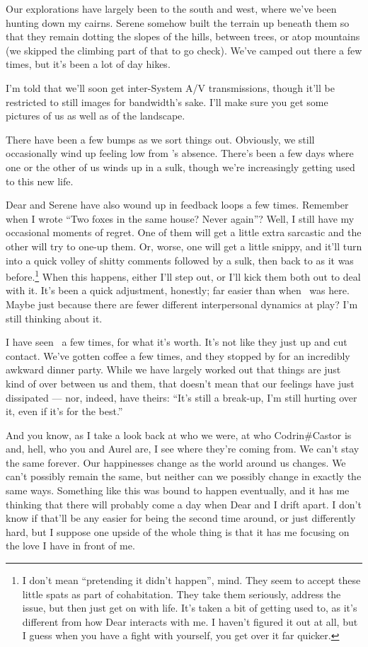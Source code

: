 Our explorations have largely been to the south and west, where we've been hunting down my cairns. Serene somehow built the terrain up beneath them so that they remain dotting the slopes of the hills, between trees, or atop mountains (we skipped the climbing part of that to go check). We've camped out there a few times, but it's been a lot of day hikes.

I'm told that we'll soon get inter-System A/V transmissions, though it'll be restricted to still images for bandwidth's sake. I'll make sure you get some pictures of us as well as of the landscape.

There have been a few bumps as we sort things out. Obviously, we still occasionally wind up feeling low from \Partner 's absence. There's been a few days where one or the other of us winds up in a sulk, though we're increasingly getting used to this new life.

Dear and Serene have also wound up in feedback loops a few times. Remember when I wrote ``Two foxes in the same house? Never again''? Well, I still have my occasional moments of regret. One of them will get a little extra sarcastic and the other will try to one-up them. Or, worse, one will get a little snippy, and it'll turn into a quick volley of shitty comments followed by a sulk, then back to as it was before.\footnote{I don't mean ``pretending it didn't happen'', mind. They seem to accept these little spats as part of cohabitation. They take them seriously, address the issue, but then just get on with life. It's taken a bit of getting used to, as it's different from how Dear interacts with me. I haven't figured it out at all, but I guess when you have a fight with yourself, you get over it far quicker.} When this happens, either I'll step out, or I'll kick them both out to deal with it. It's been a quick adjustment, honestly; far easier than when \Partner\ was here. Maybe just because there are fewer different interpersonal dynamics at play? I'm still thinking about it.

I have seen \Partner\ a few times, for what it's worth. It's not like they just up and cut contact. We've gotten coffee a few times, and they stopped by for an incredibly awkward dinner party. While we have largely worked out that things are just kind of over between us and them, that doesn't mean that our feelings have just dissipated — nor, indeed, have theirs: ``It's still a break-up, I'm still hurting over it, even if it's for the best.''

And you know, as I take a look back at who we were, at who Codrin\#Castor is and, hell, who you and Aurel are, I see where they're coming from. We can't stay the same forever. Our happinesses change as the world around us changes. We can't possibly remain the same, but neither can we possibly change in exactly the same ways. Something like this was bound to happen eventually, and it has me thinking that there will probably come a day when Dear and I drift apart. I don't know if that'll be any easier for being the second time around, or just differently hard, but I suppose one upside of the whole thing is that it has me focusing on the love I have in front of me.

